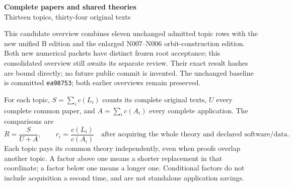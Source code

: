 \documentclass[11pt,a4paper]{article}
\begin{document}
\begin{center}\Large\textbf{Complete papers and shared theories}\\[4pt]
\normalsize Thirteen topics, thirty-four original texts\end{center}
This candidate overview combines eleven unchanged admitted topic rows with the new unified B edition and the enlarged N007--N006 orbit-construction edition. Both new numerical packets have distinct frozen root acceptance; this consolidated overview still awaits its separate review. Their exact result hashes are bound directly; no future public commit is invented. The unchanged baseline is committed \texttt{ea98753}; both earlier overviews remain preserved.

For each topic, $S=\sum_i c(L_i)$ counts its complete original texts, $U$ every complete common paper, and $A=\sum_i c(A_i)$ every complete application. The comparisons are
\[
 R=\frac{S}{U+A},\qquad r_i=\frac{c(L_i)}{c(A_i)}
 \quad\text{after acquiring the whole theory and declared software/data.}
\]
Each topic pays its common theory independently, even when proofs overlap another topic. A factor above one means a shorter replacement in that coordinate; a factor below one means a longer one. Conditional factors do not include acquisition a second time, and are not standalone application savings.
\end{document}
